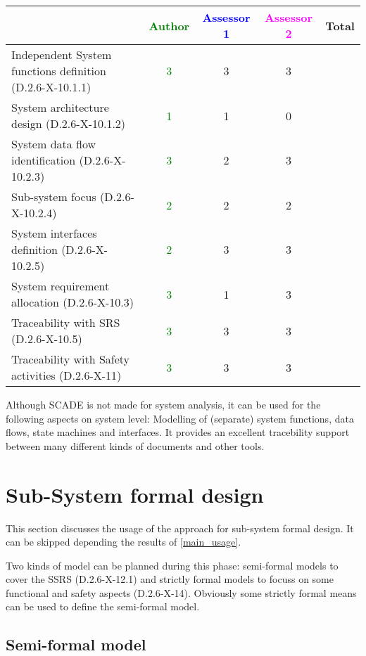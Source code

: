 \begin{tabular}{|l | c | c | c | c|}
\hline
& \textcolor{green}{Author} & \textcolor{blue}{Assessor 1} & \textcolor{magenta}{Assessor 2} & Total \\
\hline
Independent System functions definition (D.2.6-X-10.1.1)  &
\textcolor{green}{3}& 3 &3 &  \\
\hline 
System architecture design (D.2.6-X-10.1.2) & \textcolor{green}{1} & 1 &
0&  \\
\hline
System data flow identification (D.2.6-X-10.2.3)  &
\textcolor{green}{3}& 2 &3 &  \\
\hline
Sub-system focus (D.2.6-X-10.2.4)  &  \textcolor{green}{2}& 2 &2 &  \\
\hline
System interfaces definition (D.2.6-X-10.2.5)  &
\textcolor{green}{2}& 3 &3 &  \\
\hline
System requirement allocation (D.2.6-X-10.3)  &  \textcolor{green}{3}&
1 &3 &  \\
\hline
Traceability with SRS (D.2.6-X-10.5)  &  \textcolor{green}{3}& 3 &3 &  \\
\hline
Traceability with Safety activities (D.2.6-X-11)  &
\textcolor{green}{3} & 3 &3 &  \\
\hline
\end{tabular}

\begin{author_comment}
Although SCADE is not made for system analysis, it can be used for the following aspects on system level: Modelling of (separate) system functions, data flows, state machines and interfaces. It provides an excellent tracebility support between many different kinds of documents and other tools.  
\end{author_comment}


\section{Sub-System formal design}
This section discusses the usage of the approach for sub-system formal design.
It can be skipped depending the results of \ref{main_usage}.

Two kinds of model can be planned during this phase: semi-formal models to  cover the SSRS (D.2.6-X-12.1) and strictly formal  models to  focuss on some functional and safety aspects (D.2.6-X-14).  Obviously some strictly  formal means can be used to define the semi-formal  model.

\subsection{Semi-formal model}


